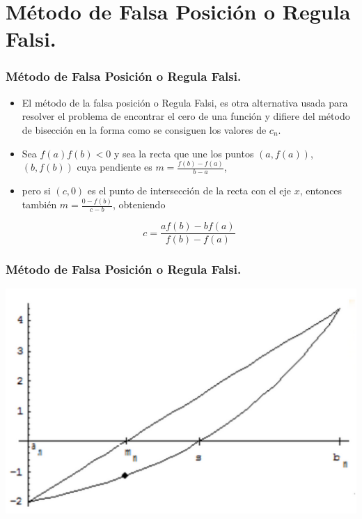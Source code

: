 \documentclass{beamer}
\begin{document}
\section{M\'etodo de Falsa Posici\'on o Regula Falsi.}
\begin{frame}[fragile]
  \frametitle{M\'etodo de Falsa Posici\'on o Regula Falsi.}
  \begin{itemize}
    \item El m\'etodo de la falsa posici\'on o Regula Falsi, es otra alternativa usada para resolver el problema de encontrar el
    cero de una funci\'on y difiere del m\'etodo de bisecci\'on en la forma como se consiguen los valores de $c_n$.
    \item<2-> Sea $f(a)f(b) < 0$ y sea la recta que une los puntos $(a, f (a))$, $(b, f (b))$ cuya pendiente es $m =
    \frac{f(b)-f(a)}{b-a}$,
    \item<3-> pero si $(c, 0)$ es el punto de intersecci\'on de la recta con el eje $x$, entonces tambi\'en $m = \frac{0 - f(b)}{c-b}$, obteniendo
    \begin{block}{}      
      $$
        c = \frac{af(b)-bf(a)}{f(b)-f(a)}
      $$
    \end{block}    
  \end{itemize}
\end{frame}
\begin{frame}
  \frametitle{M\'etodo de Falsa Posici\'on o Regula Falsi.}
  \begin{center}
    \includegraphics[scale=0.7]{regfalsi.png}
  \end{center}
\end{frame}
\end{document}
